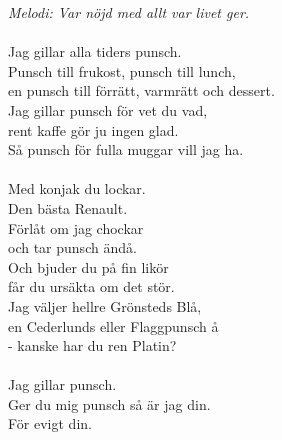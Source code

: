 {\footnotesize\textit{Melodi: Var nöjd med allt var livet ger.}}\\
\\
Jag gillar alla tiders punsch.\\
Punsch till frukost, punsch till lunch,\\
en punsch till förrätt, varmrätt och dessert.\\
Jag gillar punsch för vet du vad,\\
rent kaffe gör ju ingen glad.\\
Så punsch för fulla muggar vill jag ha.\\
\\
Med konjak du lockar.\\
Den bästa Renault.\\
Förlåt om jag chockar\\
och tar punsch ändå.\\
Och bjuder du på fin likör\\
får du ursäkta om det stör.\\
Jag väljer hellre Grönsteds Blå,\\
en Cederlunds eller Flaggpunsch å\\
 - kanske har du ren Platin?\\
\\
Jag gillar punsch.\\
Ger du mig punsch så är jag din.\\
För evigt din.
